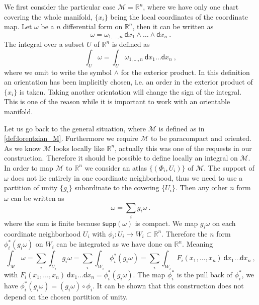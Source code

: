 \documentclass[11pt]{book}
\newcommand{\supp}{\mathsf{supp}}
\newcommand{\Mcal}{\mathcal{M}}
\newcommand{\Rbb}{\mathbb{R}}
\newcommand{\dsf}{\mathsf{d}}
\theoremstyle{break}
\begin{document}
We first consider the particular case $\Mcal=\Rbb^n$, where we have only one chart covering the whole manifold, $\{x_i\}$ being the local coordinates of the coordinate map. Let $\omega$ be a $n$ differential form on $\Rbb^n$, then it can be written as
%
\begin{equation*}
\omega = \omega_{1,\dots,n} \ \dsf x_{1} \wedge \dots \wedge \dsf x_{n} \ .
\end{equation*}
%
The integral over a subset $U$ of $\Rbb^n$ is defined as 
%
\begin{equation*}
\int_U \omega = \int_U \omega_{1,\dots,n} \ \dsf x_{1} \dots \dsf x_{n} \ ,
\end{equation*}
%
where we omit to write the symbol $\wedge$ for the exterior product.
%
In this definition an orientation has been implicitly chosen, i.e. an order in the exterior product of $\{x_i\}$ is taken. Taking another orientation will change the sign of the integral. This is one of the reason while it is important to work with an orientable manifold.


Let us go back to the general situation, where $\Mcal$ is defined as in \ref{def:lorentzian_M}. Furthermore we require $\Mcal$ to be paracompact and oriented. As we know $\Mcal$ looks locally like $\Rbb^n$, actually this was one of the requests in our construction. Therefore it should be possible to define locally an integral on $\Mcal$. In order to map $\Mcal$ to $\Rbb^n$ we consider an atlas $\{(\Phi_i,U_i)\}$ of $\Mcal$. The support of $\omega$ does not lie entirely in one coordinate neighborhood, thus we need to use a partition of unity $\{g_i\}$ subordinate to the covering $\{U_i\}$. Then any other $n$ form $\omega$ can be written as
%
\begin{equation*}
\omega = \sum_{i} g_i \omega \ .
\end{equation*}
%
where the sum is finite because $\supp(\omega)$ is compact. We map $g_i \omega$ on each coordinate neighborhood $U_i$ with $\phi_i : U_i \to W_i \subset \Rbb^n$. Therefore the $n$ form $\phi_i ^\ast (g_i\omega)$ on $W_i$ can be integrated as we have done on $\Rbb^n$. Meaning
%
\begin{equation*}
\int_\Mcal \omega = \sum_i \int_{U_i} g_i \omega = \sum_i \int_{W_i} \phi_i ^\ast (g_i\omega) = \sum_i \int_{W_i} F_i(x_1,\dots,x_n) \ \dsf x_1 \dots \dsf x_n \ ,
\end{equation*} 
%
with $F_i(x_1,\dots,x_n) \ \dsf x_1 \dots \dsf x_n = \phi_i ^\ast (g_i\omega)$. The map $\phi_i ^\ast$ is the pull back of $\phi_i ^\ast$, we have $\phi_i ^\ast(g_i\omega) = (g_i\omega) \circ \phi_i$. It can be shown that this construction does not depend on the chosen partition of unity.
\end{document}
